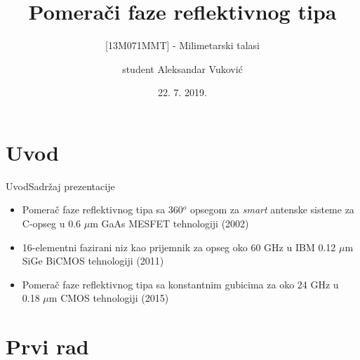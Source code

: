 \documentclass{beamer}
\title{Pomerači faze reflektivnog tipa}
\subtitle{[13M071MMT] - Milimetarski talasi}
\author{student Aleksandar Vuković}
\institute[Univerzitet u Beogradu] %
{
  Univerzitet u Beogradu \\
  Elektrotehnički fakultet
}
\date{22. 7. 2019.}
\begin{document}
\begin{frame}
  \titlepage
\end{frame}


\section{Uvod}


\begin{frame}{Uvod}{Sadržaj prezentacije}
  \begin{itemize}
  \item {
    Pomerač faze reflektivnog tipa sa 360$^o$ opsegom za \textit{smart} antenske sisteme za C-opseg u 0.6 $\mu$m GaAs MESFET tehnologiji (2002)
  }

  \item {
    16-elementni fazirani niz kao prijemnik za opseg oko 60 GHz u IBM 0.12 $\mu$m SiGe BiCMOS tehnologiji (2011)
  }

  \item {
    Pomerač faze reflektivnog tipa sa konstantnim gubicima za oko 24 GHz u 0.18 $\mu$m CMOS tehnologiji (2015)
  }
  \end{itemize}
\end{frame}




\section{Prvi rad}
\end{document}
